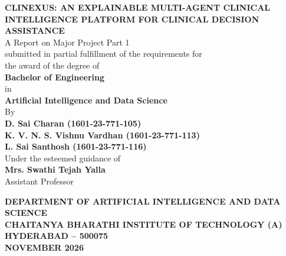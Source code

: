 \documentclass[12pt,a4paper]{report}
\begin{document}
\begin{titlepage}
\begin{center}
    \vspace*{0.5cm}
    
    {\fontsize{20pt}{24pt}\selectfont \textbf{CLINEXUS: AN EXPLAINABLE MULTI-AGENT CLINICAL INTELLIGENCE PLATFORM FOR CLINICAL DECISION ASSISTANCE}}\\[1.8cm]
    
    {\fontsize{13pt}{16pt}\selectfont A Report on Major Project Part 1\\
    submitted in partial fulfillment of the requirements for\\
    the award of the degree of}\\[0.6cm]
    
    {\fontsize{16pt}{20pt}\selectfont \textbf{Bachelor of Engineering}}\\[0.3cm]
    {\fontsize{13pt}{16pt}\selectfont in}\\[0.3cm]
    {\fontsize{15pt}{18pt}\selectfont \textbf{Artificial Intelligence and Data Science}}\\[1.2cm]
    
    {\fontsize{13pt}{16pt}\selectfont By}\\[0.4cm]
    {\fontsize{14pt}{17pt}\selectfont \textbf{D. Sai Charan (1601-23-771-105)}}\\[0.2cm]
    {\fontsize{14pt}{17pt}\selectfont \textbf{K. V. N. S. Vishnu Vardhan (1601-23-771-113)}}\\[0.2cm]
    {\fontsize{14pt}{17pt}\selectfont \textbf{L. Sai Santhosh (1601-23-771-116)}}\\[1.2cm]
    
    {\fontsize{12pt}{15pt}\selectfont Under the esteemed guidance of}\\[0.3cm]
    {\fontsize{14pt}{17pt}\selectfont \textbf{Mrs. Swathi Tejah Yalla}}\\[0.15cm]
    {\fontsize{12pt}{15pt}\selectfont Assistant Professor}\\[1.2cm]
    
    \begin{figure}[H]
        \centering
    \end{figure}
    \vspace{0.4cm}
    
    {\fontsize{13pt}{16pt}\selectfont \textbf{DEPARTMENT OF ARTIFICIAL INTELLIGENCE AND DATA SCIENCE}}\\[0.2cm]
    {\fontsize{14pt}{17pt}\selectfont \textbf{CHAITANYA BHARATHI INSTITUTE OF TECHNOLOGY (A)}}\\[0.2cm]
    {\fontsize{12pt}{15pt}\selectfont \textbf{HYDERABAD -- 500075}}\\[0.2cm]
    {\fontsize{12pt}{15pt}\selectfont \textbf{NOVEMBER 2026}}
\end{center}
\end{titlepage}
\end{document}
